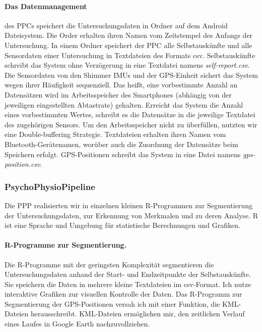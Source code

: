 \paragraph{Das Datenmanagement} 

\label{par:das_datenmanagement} des \ac{PPC}s speichert die Untersuchungsdaten in Ordner auf dem Android Dateisystem. Die Order erhalten ihren Namen vom Zeitstempel des Anfangs der Untersuchung. In einem Ordner speichert der \ac{PPC} alle Selbstauskünfte und alle Sensordaten einer Untersuchung in Textdateien des Formats \acs{csv}. Selbstauskünfte schreibt das System ohne Verzögerung in eine Textdatei namens \emph{self-report.\acs{csv}}. Die Sensordaten von den Shimmer \acp{IMU} und der \acs{GPS}-Einheit sichert das System wegen ihrer Häufigkeit sequenziell. Das heißt, eine vorbestimmte Anzahl an Datensätzen wird im Arbeitsspeicher des Smartphones (abhängig von der jeweiligen eingestellten Abtastrate) gehalten. Erreicht das System die Anzahl eines vorbestimmten Wertes, schreibt es die Datensätze in die jeweilige Textdatei des zugehörigen Sensors. Um den Arbeitsspeicher nicht zu überfüllen, nutzten wir eine Double-buffering Strategie. Textdateien erhalten ihren Namen vom Bluetooth-Gerätenamen, worüber auch die Zuordnung der Datensätze beim Speichern erfolgt. \acs{GPS}-Positionen schreibt das System in eine Datei namens \emph{gps-position.\acs{csv}}.

\subsubsection{PsychoPhysioPipeline} 

\label{ssub:psychophysiopipeline}

Die \ac{PPP} realisierten wir in einzelnen kleinen R-Programmen zur Segmentierung der Untersuchungsdaten, zur Erkennung von Merkmalen und zu deren Analyse. R ist eine Sprache und Umgebung für statistische Berechnungen und Grafiken.

\paragraph{R-Programme zur Segmentierung.} 

\label{par:r_programme_zur_segmentierung}

Die R-Programme mit der geringsten Komplexität segmentieren die Untersuchungsdaten anhand der Start- und Endzeitpunkte der Selbstauskünfte. Sie speichern die Daten in mehrere kleine Textdateien im \acs{csv}-Format. Ich nutze interaktive Grafiken zur visuellen Kontrolle der Daten. Das R-Programm zur Segmentierung der \acs{GPS}-Positionen versah ich mit einer Funktion, die \acs{KML}-Dateien herausschreibt. \acs{KML}-Dateien ermöglichen mir, den zeitlichen Verlauf eines Laufes in Google Earth nachzuvollziehen.

